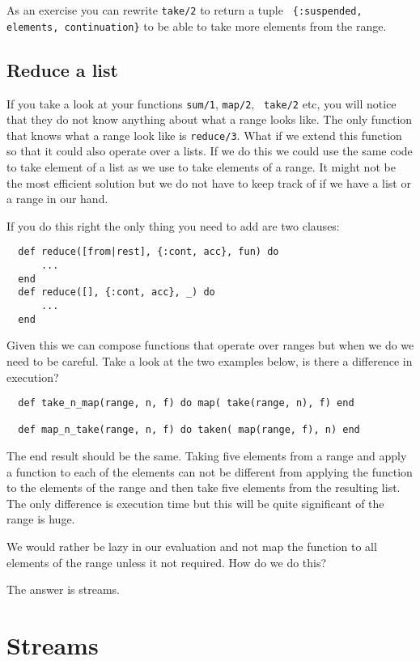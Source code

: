 \documentclass[a4paper,11pt]{article}
\begin{document}
\noindent As an exercise you can rewrite {\tt take/2} to return a tuple {\tt
  \{:suspended, elements, continuation\}} to be able to take more
elements from the range.

\subsection{Reduce a list}

If you take a look at your functions {\tt sum/1}, {\tt map/2}, {\tt
  take/2} etc, you will notice that they do not know anything about
what a range looks like. The only function that knows what a range
look like is {\tt reduce/3}. What if we extend this function so that
it could also operate over a lists. If we do this we could use the
same code to take element of a list as we use to take elements of a
range. It might not be the most efficient solution but we do not have
to keep track of if we have a list or a range in our hand.

If you do this right the only thing you need to add are two clauses:

\begin{verbatim}
  def reduce([from|rest], {:cont, acc}, fun) do
      ...
  end
  def reduce([], {:cont, acc}, _) do
      ...
  end
\end{verbatim}

\noindent Given this we can compose functions that operate over ranges
but when we do we need to be careful. Take a look at the two examples
below, is there a difference in execution?


\begin{verbatim}
  def take_n_map(range, n, f) do map( take(range, n), f) end

  def map_n_take(range, n, f) do taken( map(range, f), n) end  
\end{verbatim}

\noindent The end result should be the same. Taking five elements from
a range and apply a function to each of the elements can not be
different from applying the function to the elements of the range and
then take five elements from the resulting list. The only difference is
execution time but this will be quite significant of the range is
huge.

We would rather be lazy in our evaluation and not map the function to
all elements of the range unless it not required. How do we do this?

The answer is streams.

\section{Streams}
\end{document}
